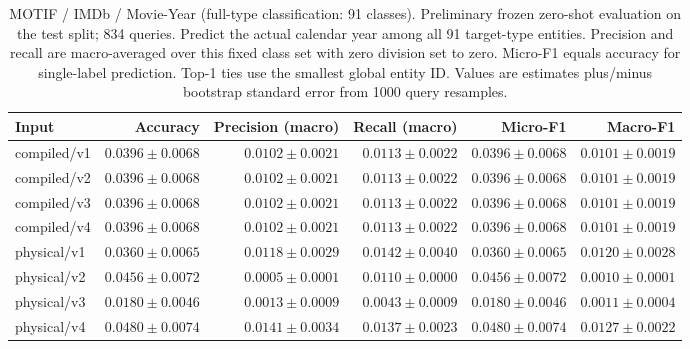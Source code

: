 \begin{table}[t]
\centering
\small
\begin{tabular}{lrrrrr}
\toprule
Input & Accuracy & Precision (macro) & Recall (macro) & Micro-F1 & Macro-F1 \\
\midrule
compiled/v1 & $0.0396 \pm 0.0068$ & $0.0102 \pm 0.0021$ & $0.0113 \pm 0.0022$ & $0.0396 \pm 0.0068$ & $0.0101 \pm 0.0019$ \\
compiled/v2 & $0.0396 \pm 0.0068$ & $0.0102 \pm 0.0021$ & $0.0113 \pm 0.0022$ & $0.0396 \pm 0.0068$ & $0.0101 \pm 0.0019$ \\
compiled/v3 & $0.0396 \pm 0.0068$ & $0.0102 \pm 0.0021$ & $0.0113 \pm 0.0022$ & $0.0396 \pm 0.0068$ & $0.0101 \pm 0.0019$ \\
compiled/v4 & $0.0396 \pm 0.0068$ & $0.0102 \pm 0.0021$ & $0.0113 \pm 0.0022$ & $0.0396 \pm 0.0068$ & $0.0101 \pm 0.0019$ \\
physical/v1 & $0.0360 \pm 0.0065$ & $0.0118 \pm 0.0029$ & $0.0142 \pm 0.0040$ & $0.0360 \pm 0.0065$ & $0.0120 \pm 0.0028$ \\
physical/v2 & $0.0456 \pm 0.0072$ & $0.0005 \pm 0.0001$ & $0.0110 \pm 0.0000$ & $0.0456 \pm 0.0072$ & $0.0010 \pm 0.0001$ \\
physical/v3 & $0.0180 \pm 0.0046$ & $0.0013 \pm 0.0009$ & $0.0043 \pm 0.0009$ & $0.0180 \pm 0.0046$ & $0.0011 \pm 0.0004$ \\
physical/v4 & $0.0480 \pm 0.0074$ & $0.0141 \pm 0.0034$ & $0.0137 \pm 0.0023$ & $0.0480 \pm 0.0074$ & $0.0127 \pm 0.0022$ \\
\bottomrule
\end{tabular}
\caption{MOTIF / IMDb / Movie-Year (full-type classification: 91 classes). Preliminary frozen zero-shot evaluation on the test split; 834 queries. Predict the actual calendar year among all 91 target-type entities. Precision and recall are macro-averaged over this fixed class set with zero division set to zero. Micro-F1 equals accuracy for single-label prediction. Top-1 ties use the smallest global entity ID. Values are estimates plus/minus bootstrap standard error from 1000 query resamples.}
\label{tab:motif-movie_year-classification}
\end{table}
